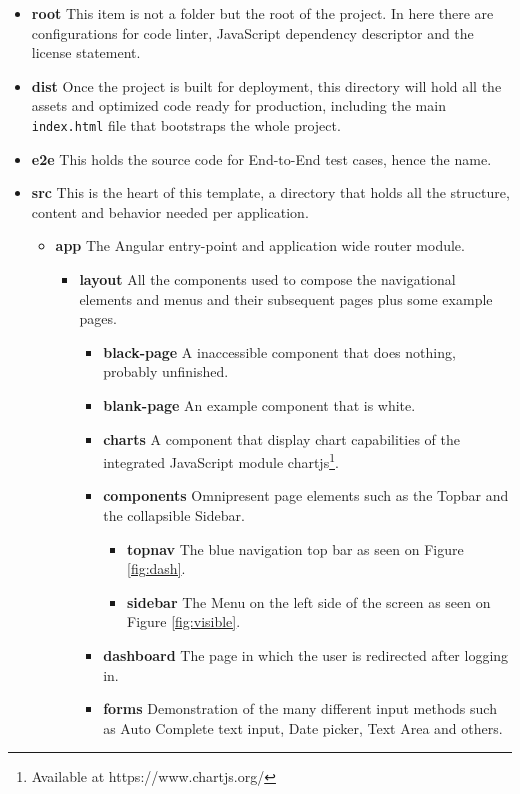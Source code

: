 \begin{itemize}
\item \textbf{root} This item is not a folder but the root of the project. In here there are configurations for code linter, JavaScript dependency descriptor and the license statement.
\item \textbf{dist} Once the project is built for deployment, this directory will hold all the assets and optimized code ready for production, including the main \texttt{index.html} file that bootstraps the whole project.
\item \textbf{e2e} This holds the source code for End-to-End test cases, hence the name.
\item \textbf{src} This is the heart of this template, a directory that holds all the structure, content and behavior needed per application. \leavevmode
  \begin{itemize}
  \item \textbf{app} The Angular entry-point and application wide router module. \leavevmode
    \begin{itemize}
    \item \textbf{layout} All the components used to compose the navigational elements and menus and their subsequent pages plus some example pages. \leavevmode
      \begin{itemize}
      \item \textbf{black-page} A inaccessible component that does nothing, probably unfinished.
      \item \textbf{blank-page} An example component that is white.
      \item \textbf{charts} A component that display chart capabilities of the integrated JavaScript module chartjs\footnote{Available at https://www.chartjs.org/}.
          \item \textbf{components} Omnipresent page elements such as the Topbar and the collapsible Sidebar.\leavevmode
        \begin{itemize}
        \item \textbf{topnav} The blue navigation top bar as seen on Figure \ref{fig:dash}.
        \item \textbf{sidebar} The Menu on the left side of the screen as seen on Figure \ref{fig:visible}.
        \end{itemize}
      \item \textbf{dashboard} The page in which the user is redirected after logging in.
      \item \textbf{forms} Demonstration of the many different input methods such as Auto Complete text input, Date picker, Text Area and others.

\end{itemize}
\end{itemize}
\end{itemize}
\end{itemize}
